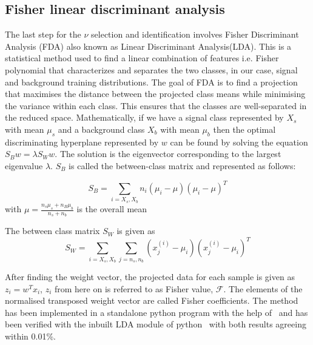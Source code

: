 \subsection{Fisher linear discriminant analysis}
\label{subsec:nu_sel_fisher}
The last step for the $\nu$ selection and identification involves Fisher Discriminant Analysis (FDA) also known as Linear Discriminant Analysis(LDA). This is a statistical method used to find a linear combination of features i.e. Fisher polynomial that characterizes and separates the two classes, in our case, signal and background training distributions. The goal of FDA is to find a projection that maximises the distance between the projected class means while minimising the variance within each class. This ensures that the classes are well-separated in the reduced space. Mathematically, if we have a signal class represented by $X_s$ with mean $\mu_s$ and a background class $X_b$ with mean $\mu_b$ then the optimal discriminating hyperplane represented by $w$ can be found by solving the equation $S_B w = \lambda S_W w$. The solution is the eigenvector corresponding to the largest eigenvalue $\lambda$. $S_B$ is called the between-class matrix and represented as follows: 

\begin{equation}
  S_B = \sum_{i = X_s,X_b} n_i (\mu_i - \mu)(\mu_i - \mu)^T
\end{equation}
with $\mu = \frac{n_s \mu_s + n_B \mu_b}{n_s + n_b}$ is the overall mean 

The between class matrix $S_W$ is given as
\begin{equation}
  S_W = \sum_{i = X_s,X_b} \sum_{j = n_s,n_b } (x^{(i)}_j - \mu_i) (x^{(i)}_j - \mu_i)^T
\end{equation}

After finding the weight vector, the projected data for each sample is given as $z_i = w^Tx_i$, $z_i$ from here on is referred to as Fisher value, $\mathcal{F}$. The elements of the normalised transposed weight vector are called Fisher coefficients. The method has been implemented in a standalone python program with the help of~\cite{JaimeAlvarezMuniz_conversation} and has been verified with the inbuilt LDA module of python~\cite{scikit_Learn} with both results agreeing within 0.01\%. 

